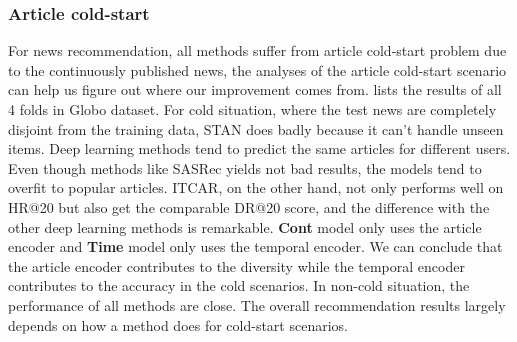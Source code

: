 \subsubsection{Article cold-start}
\label{sec:itemcold}
For news recommendation, all methods suffer from article cold-start problem due to the continuously published news, the analyses of the article cold-start scenario can help us 
figure out where our improvement comes from. 
 lists the results of all 4 folds in Globo dataset. 
For cold situation, where the test news are completely disjoint from
the training data, STAN does badly because it can't handle unseen items.
Deep learning methods tend to predict the same articles for different users. 
Even though methods like SASRec yields not bad results, 
the models tend to overfit to popular articles. ITCAR, on the other hand, not only performs well on HR@20 but also get the comparable DR@20 score, and the difference with the
other deep learning methods is remarkable. 
\textbf{Cont} model only uses the article encoder and 
\textbf{Time} model only uses the temporal encoder. We can conclude that 
the article encoder contributes to the diversity while the temporal encoder contributes 
to the accuracy in the cold scenarios. 
In non-cold situation, the performance of all methods are close.  
The overall recommendation results largely depends on how a method does for 
cold-start scenarios.


